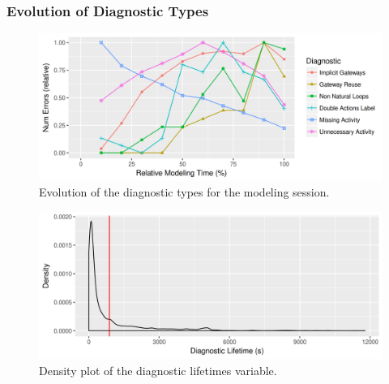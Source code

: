 \subsubsection{Evolution of Diagnostic Types}


\begin{figure}
\includegraphics[width=\textwidth]{figures/results/evolution}
\caption{Evolution of the diagnostic types for the modeling session.}
\label{fig:error_evolution}
\end{figure}
\begin{figure}

\includegraphics[width=\textwidth]{figures/results/lifetime_density.png}
\caption{Density plot of the diagnostic lifetimes variable.}
\label{fig:avg_lifetime_distribution}
\end{figure}

